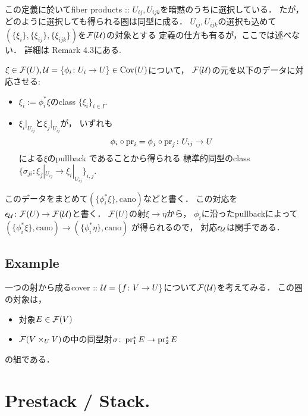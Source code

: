 \documentclass[a4paper, dvipdfmx]{jsarticle}
\begin{document}
\begin{Remark}
    この定義に於いてfiber products :: $U_{ij}, U_{ijk}$を暗黙のうちに選択している．
    たが，どのように選択しても得られる圏は同型に成る．
    $U_{ij}, U_{ijk}$の選択も込めて
    $(\{\xi_i\}, \{\xi_{ij}\}, \{\xi_{ijk}\})$を$\mathcal{F}(\mathcal{U})$の対象とする
    定義の仕方も有るが，ここでは述べない．
    詳細は\cite{NoteGroTop} Remark 4.3にある.
\end{Remark}

\begin{Def} \label{def:epsilon}
    $\xi \in \mathcal{F}(U), \mathcal{U}=\{\phi_i \colon U_i \to U\} \in \operatorname{Cov}(U)$について，
    $\mathcal{F}(\mathcal{U})$の元を以下のデータに対応させる:
    \begin{itemize}
        \item $\xi_i:=\phi_i^*\xi$のclass $\{\xi_i\}_{i \in I}$.
        \item
            $\xi_i|_{U_{ij}}$と$\xi_j|_{U_{ij}}$が，
            いずれも
            \[ \phi_i \circ \operatorname{pr}_i=\phi_j \circ \operatorname{pr}_j \colon U_{ij} \to U \]による$\xi$のpullback
            であることから得られる
            標準的同型のclass $\{ \sigma_{ji} \colon \xi_j|_{U_{ij}} \to \xi_i|_{U_{ij}} \}_{i,j}$.
    \end{itemize}
    このデータをまとめて$(\{\phi_i^*\xi\}, \mathrm{cano})$などと書く．
    この対応を$\epsilon_{\mathcal{U}} \colon \mathcal{F}(U) \to \mathcal{F}(\mathcal{U})$と書く．
    $\mathcal{F}(U)$の射$\xi \to \eta$から，
    $\phi_i$に沿ったpullbackによって$(\{\phi_i^*\xi\}, \mathrm{cano}) \to (\{\phi_i^*\eta\}, \mathrm{cano})$
    が得られるので，
    対応$\epsilon_{\mathcal{U}}$は関手である．
\end{Def}

\subsection{Example}
\begin{Example}
    一つの射から成るcover :: $\mathcal{U}=\{f \colon V \to U\}$について$\mathcal{F}(\mathcal{U})$を考えてみる．
    この圏の対象は，
    \begin{itemize}
        \item 対象$E \in \mathcal{F}(V)$
        \item $\mathcal{F}(V \times_U V)$の中の同型射$\sigma \colon \operatorname{pr}_1^*E \to \operatorname{pr}_2^*E$
    \end{itemize}
    の組である．
\end{Example}

\section{Prestack / Stack.}
\end{document}
